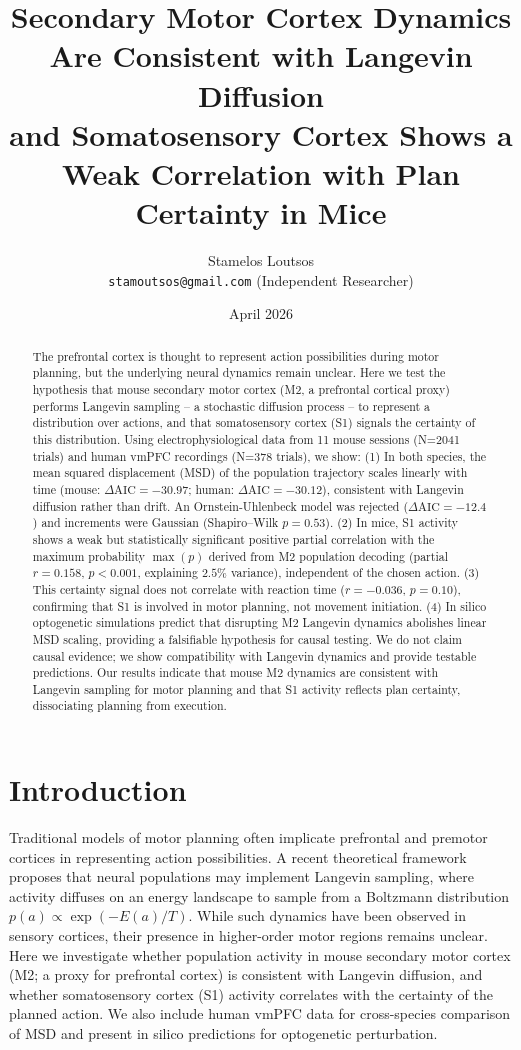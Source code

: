 \documentclass[10pt,onecolumn]{article}
\title{Secondary Motor Cortex Dynamics Are Consistent with Langevin Diffusion\\
       \large{and Somatosensory Cortex Shows a Weak Correlation with Plan Certainty in Mice}}
\author{Stamelos Loutsos\\ \texttt{stamoutsos@gmail.com} (Independent Researcher)}
\date{April 2026}
\begin{document}
\maketitle

\begin{abstract}
The prefrontal cortex is thought to represent action possibilities during motor planning, but the underlying neural dynamics remain unclear. Here we test the hypothesis that mouse secondary motor cortex (M2, a prefrontal cortical proxy) performs Langevin sampling – a stochastic diffusion process – to represent a distribution over actions, and that somatosensory cortex (S1) signals the certainty of this distribution. Using electrophysiological data from 11 mouse sessions (N=2041 trials) and human vmPFC recordings (N=378 trials), we show: (1) In both species, the mean squared displacement (MSD) of the population trajectory scales linearly with time (mouse: \(\Delta \mathrm{AIC} = -30.97\); human: \(\Delta \mathrm{AIC} = -30.12\)), consistent with Langevin diffusion rather than drift. An Ornstein-Uhlenbeck model was rejected (\(\Delta \mathrm{AIC} = -12.4\)) and increments were Gaussian (Shapiro–Wilk \(p = 0.53\)). (2) In mice, S1 activity shows a weak but statistically significant positive partial correlation with the maximum probability \(\max(p)\) derived from M2 population decoding (partial \(r = 0.158\), \(p < 0.001\), explaining \(2.5\%\) variance), independent of the chosen action. (3) This certainty signal does not correlate with reaction time (\(r = -0.036\), \(p = 0.10\)), confirming that S1 is involved in motor planning, not movement initiation. (4) In silico optogenetic simulations predict that disrupting M2 Langevin dynamics abolishes linear MSD scaling, providing a falsifiable hypothesis for causal testing. We do not claim causal evidence; we show compatibility with Langevin dynamics and provide testable predictions. Our results indicate that mouse M2 dynamics are consistent with Langevin sampling for motor planning and that S1 activity reflects plan certainty, dissociating planning from execution.
\end{abstract}

\section{Introduction}
Traditional models of motor planning often implicate prefrontal and premotor cortices in representing action possibilities. A recent theoretical framework proposes that neural populations may implement Langevin sampling, where activity diffuses on an energy landscape to sample from a Boltzmann distribution \(p(a) \propto \exp(-E(a)/T)\). While such dynamics have been observed in sensory cortices, their presence in higher-order motor regions remains unclear. Here we investigate whether population activity in mouse secondary motor cortex (M2; a proxy for prefrontal cortex) is consistent with Langevin diffusion, and whether somatosensory cortex (S1) activity correlates with the certainty of the planned action. We also include human vmPFC data for cross-species comparison of MSD and present in silico predictions for optogenetic perturbation.
\end{document}
